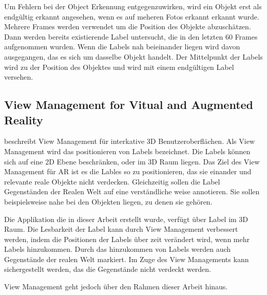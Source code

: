 Um Fehlern bei der Object Erkennung entgegenzuwirken, wird ein Objekt erst als endgültig erkannt angesehen, wenn es auf meheren Fotos erkannt erkannt wurde. Mehrere Frames werden verwendet um die Position des Objekte abzuschätzen. Dann werden bereits existierende Label untersucht, die in den letzten 60 Frames aufgenommen wurden. Wenn die Labels nah beieinander liegen wird davon ausgegangen, das es sich um dasselbe Objekt handelt. Der Mittelpunkt der Labels wird zu der Position des Objektes und wird mit einem endgültigen Label versehen.


\subsection{View Management for Vitual and Augmented Reality}

\cite{viewmanagement3d} beschreibt View Management für interkative 3D Benutzeroberflächen. Als View Management wird das positionieren von Labels bezeichnet.
Die Labels können sich auf eine 2D Ebene beschränken, oder im 3D Raum liegen. Das Ziel des View Management für AR ist es die Lables so zu positionieren, das sie einander und relevante reale Objekte nicht verdecken. Gleichzeitig sollen die Label Gegenständen der Realen Welt  auf eine verständliche weise annotieren. Sie sollen beispielsweise nahe bei den Objekten liegen, zu denen sie gehören.

Die Applikation die in dieser Arbeit erstellt wurde, verfügt über Label im 3D Raum. Die Lesbarkeit der Label kann durch View Management verbessert werden, indem die Positionen der Labels über zeit verändert wird, wenn mehr Labels hinzukommen. Durch das hinzukommen von Labels werden auch Gegenstände der realen Welt markiert. Im Zuge des View Managements kann sichergestellt werden, das die Gegenstände nicht verdeckt werden. 

View Management geht jedoch über den Rahmen dieser Arbeit hinaus.\citep{viewmanagement3d}


